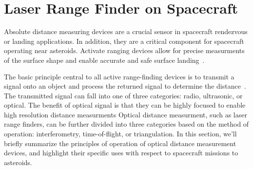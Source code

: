 

\section{Laser Range Finder on Spacecraft}

Absolute distance measuring devices are a crucial sensor in spacecraft rendezvous or landing applications.
In addition, they are a critical component for spacecraft operating near asteroids.
Activate ranging devices allow for precise measurments of the surface shape and enable accurate and safe surface landing~\cite{berry2013}.

The basic principle central to all active range-finding devices is to transmit a signal onto an object and process the returned signal to determine the distance~\cite{amann2001}.
The transmitted signal can fall into one of three categories: radio, ultrasonic, or optical.
The benefit of optical signal is that they can be highly focused to enable high resolution distance measurments
Optical distance measurment, such as laser range finders, can be further divided into three categories based on the method of operation: interferometry, time-of-flight, or triangulation.
In this section, we'll briefly summarize the principles of operation of optical distance measurement devices, and highlight their specific uses with respect to spacecraft missions to asteroids.



